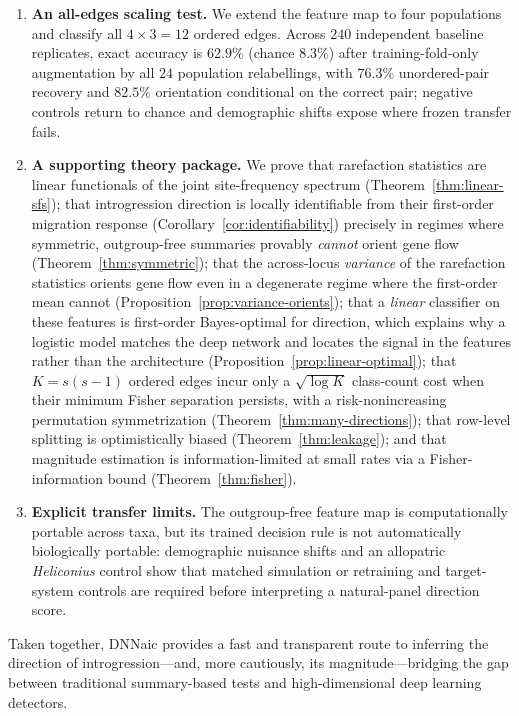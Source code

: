 \documentclass[11pt]{article}
\theoremstyle{plain}
\theoremstyle{definition}
\theoremstyle{remark}
\begin{document}
\begin{enumerate}
  \item \textbf{An all-edges scaling test.} We extend the feature map to four populations and classify all $4\times3=12$ ordered edges. Across $240$ independent baseline replicates, exact accuracy is $62.9\%$ (chance $8.3\%$) after training-fold-only augmentation by all $24$ population relabellings, with $76.3\%$ unordered-pair recovery and $82.5\%$ orientation conditional on the correct pair; negative controls return to chance and demographic shifts expose where frozen transfer fails.
  \item \textbf{A supporting theory package.} We prove that rarefaction statistics are linear functionals of the joint site-frequency spectrum (Theorem~\ref{thm:linear-sfs}); that introgression direction is locally identifiable from their first-order migration response (Corollary~\ref{cor:identifiability}) precisely in regimes where symmetric, outgroup-free summaries provably \emph{cannot} orient gene flow (Theorem~\ref{thm:symmetric}); that the across-locus \emph{variance} of the rarefaction statistics orients gene flow even in a degenerate regime where the first-order mean cannot (Proposition~\ref{prop:variance-orients}); that a \emph{linear} classifier on these features is first-order Bayes-optimal for direction, which explains why a logistic model matches the deep network and locates the signal in the features rather than the architecture (Proposition~\ref{prop:linear-optimal}); that $K=s(s-1)$ ordered edges incur only a $\sqrt{\log K}$ class-count cost when their minimum Fisher separation persists, with a risk-nonincreasing permutation symmetrization (Theorem~\ref{thm:many-directions}); that row-level splitting is optimistically biased (Theorem~\ref{thm:leakage}); and that magnitude estimation is information-limited at small rates via a Fisher-information bound (Theorem~\ref{thm:fisher}).
  \item \textbf{Explicit transfer limits.} The outgroup-free feature map is computationally portable across taxa, but its trained decision rule is not automatically biologically portable: demographic nuisance shifts and an allopatric \textit{Heliconius} control show that matched simulation or retraining and target-system controls are required before interpreting a natural-panel direction score.
\end{enumerate}
Taken together, DNNaic provides a fast and transparent route to inferring the direction of introgression---and, more cautiously, its magnitude---bridging the gap between traditional summary-based tests and high-dimensional deep learning detectors.
\end{document}
